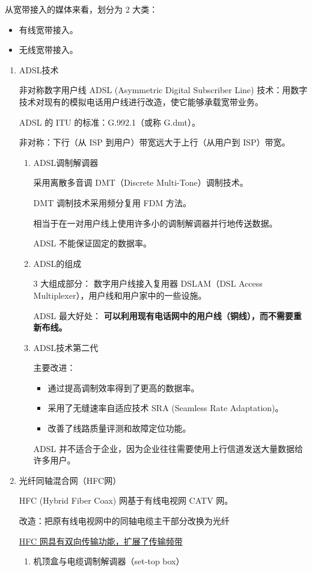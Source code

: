 \documentclass[11pt]{article}
\begin{document}
从宽带接入的媒体来看，划分为 2 大类：
\begin{itemize}
\item 有线宽带接入。
\item 无线宽带接入。
\end{itemize}
\begin{enumerate}
\item ADSL技术
\label{sec:org255d0a2}

非对称数字用户线 ADSL (Asymmetric Digital Subscriber Line) 技术：用数字技术对现有的模拟电话用户线进行改造，使它能够承载宽带业务。

ADSL 的 ITU 的标准：G.992.1（或称 G.dmt）。

非对称：下行（从 ISP 到用户）带宽远大于上行（从用户到 ISP）带宽。
\begin{enumerate}
\item ADSL调制解调器
\label{sec:org85c65ff}

采用离散多音调 DMT（Discrete Multi-Tone）调制技术。

DMT 调制技术采用频分复用 FDM 方法。

相当于在一对用户线上使用许多小的调制解调器并行地传送数据。

ADSL 不能保证固定的数据率。
\item ADSL的组成
\label{sec:org841904f}

3 大组成部分：
数字用户线接入复用器 DSLAM（DSL Access Multiplexer），用户线和用户家中的一些设施。

ADSL 最大好处： \textbf{可以利用现有电话网中的用户线（铜线），而不需要重新布线。}
\item ADSL技术第二代
\label{sec:org6f5d008}

主要改进：
\begin{itemize}
\item 通过提高调制效率得到了更高的数据率。
\item 采用了无缝速率自适应技术 SRA (Seamless Rate Adaptation)。
\item 改善了线路质量评测和故障定位功能。
\end{itemize}

ADSL 并不适合于企业，因为企业往往需要使用上行信道发送大量数据给许多用户。
\end{enumerate}
\item 光纤同轴混合网（HFC网）
\label{sec:org32c1ad0}

HFC (Hybrid Fiber Coax) 网基于有线电视网 CATV 网。

改造：把原有线电视网中的同轴电缆主干部分改换为光纤

\uline{HFC 网具有双向传输功能，扩展了传输频带}
\begin{enumerate}
\item 机顶盒与电缆调制解调器（set-top box）
\label{sec:orge9040e6}


\end{enumerate}
\end{enumerate}
\end{document}
